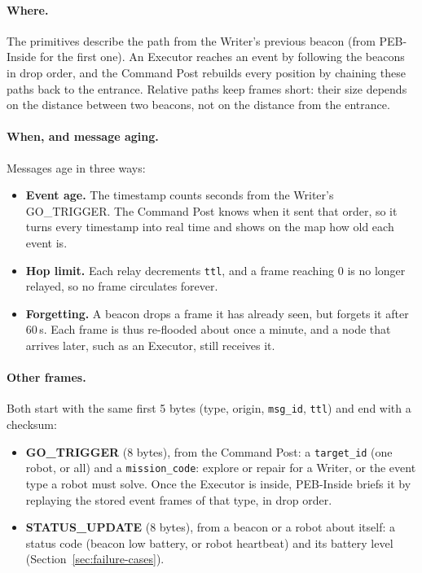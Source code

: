 \paragraph{Where.} The primitives describe the path from the Writer's
previous beacon (from PEB-Inside for the first one). An Executor reaches an
event by following the beacons in drop order, and the Command Post rebuilds
every position by chaining these paths back to the entrance. Relative paths
keep frames short: their size depends on the distance between two beacons,
not on the distance from the entrance.

\paragraph{When, and message aging.} Messages age in three ways:
\begin{itemize}
  \item \textbf{Event age.} The timestamp counts seconds from the Writer's
    GO\_TRIGGER. The Command Post knows when it sent that order, so it turns
    every timestamp into real time and shows on the map how old each event is.
  \item \textbf{Hop limit.} Each relay decrements \texttt{ttl}, and a frame
    reaching 0 is no longer relayed, so no frame circulates forever.
  \item \textbf{Forgetting.} A beacon drops a frame it has already seen, but
    forgets it after 60\,s. Each frame is thus re-flooded about once a minute,
    and a node that arrives later, such as an Executor, still receives it.
\end{itemize}

\paragraph{Other frames.} Both start with the same first 5 bytes (type,
origin, \texttt{msg\_id}, \texttt{ttl}) and end with a checksum:
\begin{itemize}
  \item \textbf{GO\_TRIGGER} (8 bytes), from the Command Post: a
    \texttt{target\_id} (one robot, or all) and a \texttt{mission\_code}:
    explore or repair for a Writer, or the event type a robot must solve. Once the
    Executor is inside, PEB-Inside briefs it by replaying the stored event
    frames of that type, in drop order.
  \item \textbf{STATUS\_UPDATE} (8 bytes), from a beacon or a robot about
    itself: a status code (beacon low battery, or robot heartbeat) and its
    battery level (Section~\ref{sec:failure-cases}).
\end{itemize}
